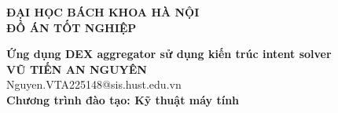\documentclass[DoAn.tex]{subfiles}
\begin{document}
\begin{titlepage}
\thispagestyle{empty}
\begin{center}

{\textbf{\large{ĐẠI HỌC BÁCH KHOA HÀ NỘI}}}\\[4cm]

{\textbf{\huge{ ĐỒ ÁN TỐT NGHIỆP}}}\\[1cm]
{\textbf{\Large{Ứng dụng DEX aggregator sử dụng kiến trúc intent solver}}\\[1cm]

{\textbf{\large{VŨ TIẾN AN NGUYÊN}}}\\
{\large{Nguyen.VTA225148@sis.hust.edu.vn}}\\[0.5cm]

{\textbf{\large{Chương trình đào tạo: Kỹ thuật máy tính
}}}\\

\vspace{4cm}
\begin{table}[H]
\centering
{}
\end{table}}
\end{center}



\end{titlepage}
\end{document}
